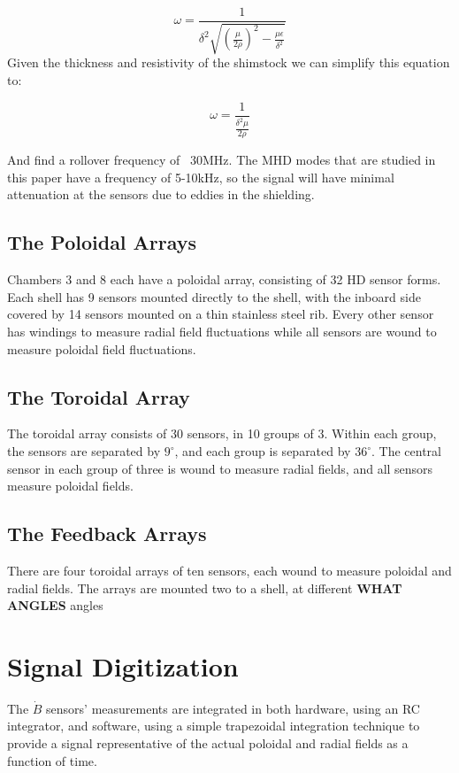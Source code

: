 \begin{equation}
\omega = \frac{1}{\delta^2 \sqrt{(\frac{\mu}{2\rho})^2-\frac{\mu\epsilon}{\delta^2}}}
\end{equation}
Given the thickness and resistivity of the shimstock we can simplify this equation to:

\begin{equation}
\omega = \frac{1}{\frac{\delta^2\mu}{2\rho}}
\end{equation}

And find a rollover frequency of ~30MHz.  The MHD modes that are studied in this  paper have a frequency of 5-10kHz, so the signal will have minimal attenuation at the sensors due to eddies in the shielding.

\subsection{The Poloidal Arrays}
Chambers 3 and 8 each have a poloidal array, consisting of 32 HD sensor forms.  Each shell has 9 sensors mounted directly to the shell, with the inboard side covered by 14 sensors mounted on a thin stainless steel rib.  Every other sensor has windings to measure radial field fluctuations while all sensors are wound to measure poloidal field fluctuations.

\subsection{The Toroidal Array}
The toroidal array consists of 30 sensors, in 10 groups of 3.  Within each group, the sensors are separated by $9^{\circ}$, and each group is separated by $36^{\circ}$.  The central sensor in each group of three is wound to measure radial fields, and all sensors measure poloidal fields.  

\subsection{The Feedback Arrays}
There are four toroidal arrays of ten sensors, each wound to measure poloidal and radial fields.  The arrays are mounted two to a shell, at different \textbf{WHAT ANGLES} angles
\section{Signal Digitization}
The $\dot{B}$ sensors' measurements are integrated in both hardware, using an RC integrator, and software, using a simple trapezoidal integration technique to provide a signal representative of the actual poloidal and radial fields as a function of time.  